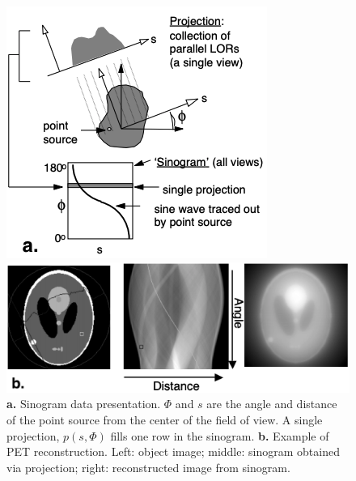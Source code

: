 \documentclass[11pt,a4paper]{article}
\begin{document}
    \begin{figure}[!htb]
        \vspace{-0.5cm}
        \begin{minipage}{0.45\textwidth}
        \includegraphics[width=\textwidth]{sinogram}
        \end{minipage}\hfill
        \begin{minipage}{0.55\textwidth}
        \includegraphics[width=\textwidth]{pet_recon.png}
        \caption{\textbf{a.} Sinogram data presentation. $\Phi$ and $s$ are the angle and distance of the point source from the center of the field of view. A single projection, $p(s,\Phi)$ fills one row in the sinogram. \textbf{b.} Example of PET reconstruction. Left: object image; middle: sinogram obtained via projection; right: reconstructed image from sinogram. \cite{adam2007intro}}
        \end{minipage}
        \label{fig:1}
        \vspace{-0.5cm}
    \end{figure}
    
\end{document}
